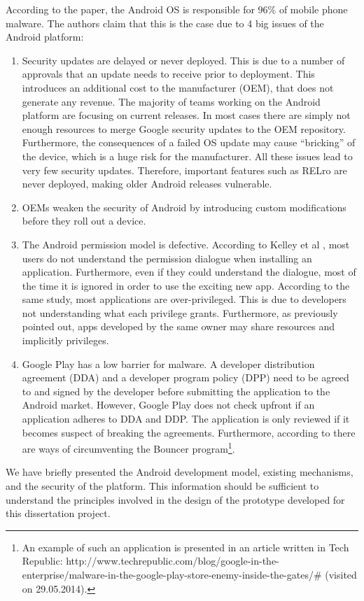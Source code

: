 According to the paper, the Android OS is responsible for $96\%$ of mobile phone malware. The authors claim that this is the case due to 4 big issues of the Android platform:
\begin{enumerate}
	\item Security updates are delayed or never deployed. This is due to a number of approvals that an update needs to receive prior to deployment. This introduces an additional cost to the manufacturer (OEM), that does not generate any revenue. The majority of teams working on the Android platform are focusing on current releases. In most cases there are simply not enough resources to merge Google security updates to the OEM repository. Furthermore, the consequences of a failed OS update may cause ``bricking'' of the device, which is a huge risk for the manufacturer. All these issues lead to very few security updates. Therefore, important features such as RELro are never deployed, making older Android releases vulnerable.
	
	\item OEMs weaken the security of Android by introducing custom modifications before they roll out a device.
	
	\item The Android permission model is defective. According to Kelley et al \cite{kelley2012conundrum}, most users do not understand the permission dialogue when installing an application. Furthermore, even if they could understand the dialogue, most of the time it is ignored in order to use the exciting new app. According to the same study, most applications are over-privileged. This is due to developers not understanding what each privilege grants. Furthermore, as previously pointed out, apps developed by the same owner may share resources and implicitly privileges.
	
	\item Google Play has a low barrier for malware. A developer distribution agreement (DDA) and a developer program policy (DPP) need to be agreed to and signed by the developer before submitting the application to the Android market. However, Google Play does not check upfront if an application adheres to DDA and DDP. The application is only reviewed if it becomes suspect of breaking the agreements. Furthermore, according to \cite{percoco2012adventures} there are ways of circumventing the Bouncer program\footnote{An example of such an application is presented in an article written in Tech Republic: http://www.techrepublic.com/blog/google-in-the-enterprise/malware-in-the-google-play-store-enemy-inside-the-gates/\# (visited on 29.05.2014).}. 
\end{enumerate}

We have briefly presented the Android development model, existing mechanisms, and the security of the platform. This information should be sufficient to understand the principles involved in the design of the prototype developed for this dissertation project.

